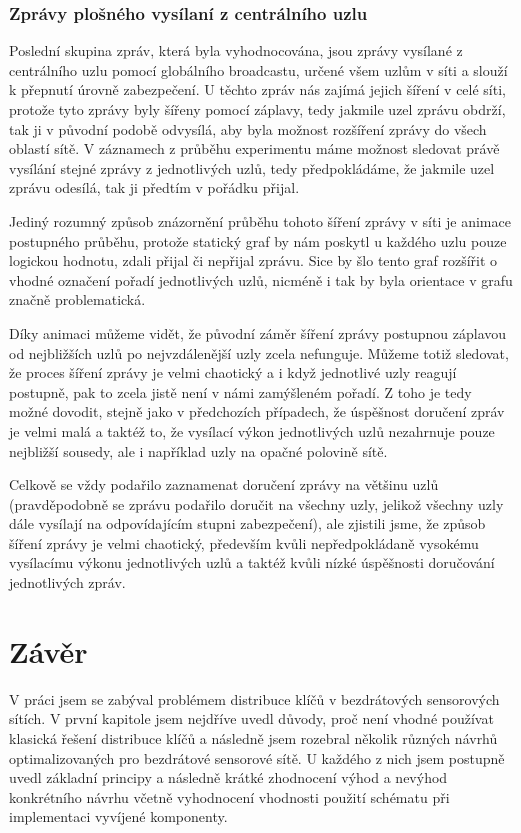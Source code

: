 \documentclass[11pt,final,twoside]{fithesis2}
\begin{document}
\subsection{Zprávy plošného vysílaní z centrálního uzlu}
Poslední skupina zpráv, která byla vyhodnocována, jsou zprávy vysílané z centrálního uzlu pomocí globálního broadcastu, určené všem uzlům 
v síti a slouží k přepnutí úrovně zabezpečení. U těchto zpráv nás zajímá jejich šíření v celé síti, protože tyto zprávy byly šířeny 
pomocí záplavy, tedy jakmile uzel zprávu obdrží, tak ji v původní podobě odvysílá, aby byla možnost rozšíření zprávy do všech oblastí 
sítě. V záznamech z průběhu experimentu máme možnost sledovat právě vysílání stejné zprávy z jednotlivých uzlů, tedy předpokládáme, že jakmile uzel zprávu 
odesílá, tak ji předtím v pořádku přijal.

Jediný rozumný způsob znázornění průběhu tohoto šíření zprávy v síti je animace postupného průběhu, protože statický graf by nám poskytl
u každého uzlu pouze logickou hodnotu, zdali přijal či nepřijal zprávu. Sice by šlo tento graf rozšířit o vhodné označení pořadí 
jednotlivých uzlů, nicméně i tak by byla orientace v grafu značně problematická. 

Díky animaci můžeme vidět, že původní záměr šíření zprávy postupnou záplavou od nejbližších uzlů po nejvzdálenější uzly zcela 
nefunguje. Můžeme totiž sledovat, že proces šíření zprávy je velmi chaotický a i když jednotlivé uzly reagují postupně, pak to zcela 
jistě není v námi zamýšleném pořadí. Z toho je tedy možné dovodit, stejně jako v předchozích případech, že úspěšnost doručení zpráv je 
velmi malá a taktéž to, že vysílací výkon jednotlivých uzlů nezahrnuje pouze nejbližší sousedy, ale i například uzly na opačné polovině 
sítě. 

Celkově se vždy podařilo zaznamenat doručení zprávy na většinu uzlů (pravděpodobně se zprávu podařilo doručit na všechny uzly, jelikož 
všechny uzly dále vysílají na odpovídajícím stupni zabezpečení), ale zjistili jsme, že způsob šíření zprávy je velmi chaotický, především
kvůli nepředpokládaně vysokému vysílacímu výkonu jednotlivých uzlů a taktéž kvůli nízké úspěšnosti doručování jednotlivých zpráv.

\chapter{Závěr}

V práci jsem se zabýval problémem distribuce klíčů v bezdrátových sensorových sítích. V první kapitole jsem nejdříve uvedl důvody, proč není vhodné používat klasická řešení distribuce klíčů
a následně jsem rozebral několik různých návrhů optimalizovaných pro bezdrátové sensorové sítě. U každého z nich jsem postupně uvedl základní principy a následně krátké zhodnocení výhod a nevýhod konkrétního 
návrhu včetně vyhodnocení vhodnosti použití schématu při implementaci vyvíjené komponenty. 
\end{document}
